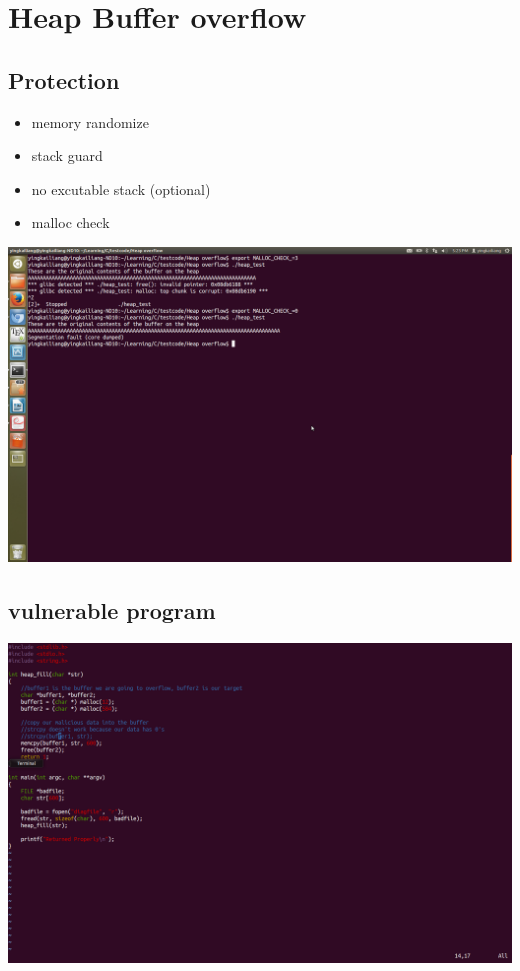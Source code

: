 \documentclass[12pt]{article}
\begin{document}
\section{Heap Buffer overflow}

\subsection{Protection}
\begin{itemize}
\item memory randomize 
\item stack guard
\item no excutable stack (optional)
\item malloc check
\end{itemize}
\includegraphics[scale=0.3]{Malloc_check.png}

\subsection{vulnerable program}
\includegraphics[scale=0.3]{vul_pro.png}
\end{document}
